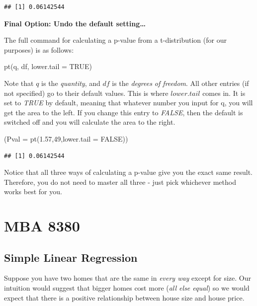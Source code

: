 \documentclass[
]{book}
\newenvironment{Shaded}{\begin{snugshade}}{\end{snugshade}}
\newcommand{\AttributeTok}[1]{\textcolor[rgb]{0.77,0.63,0.00}{#1}}
\newcommand{\ConstantTok}[1]{\textcolor[rgb]{0.00,0.00,0.00}{#1}}
\newcommand{\DecValTok}[1]{\textcolor[rgb]{0.00,0.00,0.81}{#1}}
\newcommand{\FloatTok}[1]{\textcolor[rgb]{0.00,0.00,0.81}{#1}}
\newcommand{\FunctionTok}[1]{\textcolor[rgb]{0.00,0.00,0.00}{#1}}
\newcommand{\NormalTok}[1]{#1}
\begin{document}
\begin{verbatim}
## [1] 0.06142544
\end{verbatim}

\textbf{Final Option: Undo the default setting\ldots{}}

The full command for calculating a p-value from a t-distribution (for our purposes) is as follows:

pt(q, df, lower.tail = TRUE)

Note that \(q\) is the \emph{quantity}, and \(df\) is the \emph{degrees of freedom}. All other entries (if not specified) go to their default values. This is where \(lower.tail\) comes in. It is set to \emph{TRUE} by default, meaning that whatever number you input for q, you will get the area to the left. If you change this entry to \emph{FALSE}, then the default is switched off and you will calculate the area to the right.

\begin{Shaded}
\begin{Highlighting}[]
\NormalTok{(}\AttributeTok{Pval =} \FunctionTok{pt}\NormalTok{(}\FloatTok{1.57}\NormalTok{,}\DecValTok{49}\NormalTok{,}\AttributeTok{lower.tail =} \ConstantTok{FALSE}\NormalTok{))}
\end{Highlighting}
\end{Shaded}

\begin{verbatim}
## [1] 0.06142544
\end{verbatim}

Notice that all three ways of calculating a p-value give you the exact same result. Therefore, you do not need to master all three - just pick whichever method works best for you.

\hypertarget{part-mba-8380}{%
\part*{MBA 8380}\label{part-mba-8380}}

\hypertarget{SLR}{%
\chapter{Simple Linear Regression}\label{SLR}}

Suppose you have two homes that are the same in \emph{every way} except for size. Our intuition would suggest that bigger homes cost more (\emph{all else equal}) so we would expect that there is a positive relationship between house size and house price.
\end{document}
